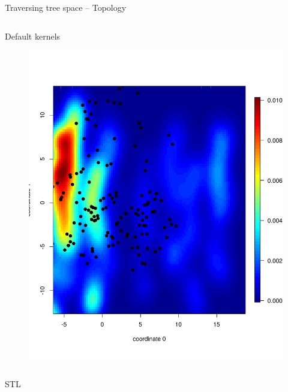 \documentclass[newPxFont,numfooter,sectionpages]{beamer}
\begin{document}
\begin{frame}{Traversing tree space -- Topology}
 \begin{column}{0.5\textwidth}
 \begin{center}
   Default kernels
\begin{figure}
	\includegraphics[width=\textwidth]{figures/mds_RF_default_denv4.pdf}
\end{figure}
 \end{center}
\end{column}
 \begin{column}{0.5\textwidth}
  \begin{center}
  STL
\begin{figure}

\end{figure}
\end{center}
\end{column}
\end{frame}
\end{document}
